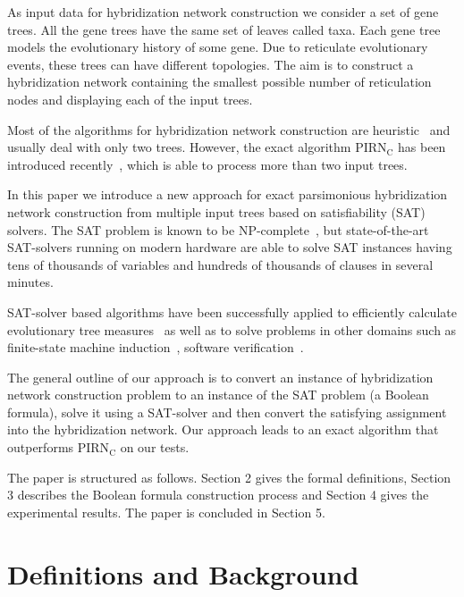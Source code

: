 \documentclass[runningheads, envcountsame, a4paper]{llncs}
\begin{document}
As input data for hybridization network construction we consider a set of gene trees. 
All the gene trees have the same set of leaves called taxa.
Each gene tree models the evolutionary history of some gene. 
Due to reticulate evolutionary events, these trees can have different topologies.
The aim is to construct a hybridization network containing the smallest possible number of 
reticulation nodes and displaying each of the input trees. 

Most of the algorithms for hybridization network construction are heuristic~\cite{wu2013algorithm, park2012murpar} 
and usually deal with only two trees.
However, the exact algorithm PIRN$_\mathrm{C}$ has been introduced recently~\cite{wu2013algorithm}, which is able to process more than two input trees.

In this paper we introduce a new approach for exact parsimonious
hybridization network construction from multiple input trees based on satisfiability (SAT) solvers.
The SAT problem is known to be NP-complete~\cite{bordewich2007computing}, but state-of-the-art SAT-solvers running on modern hardware 
are able to solve SAT instances having tens of thousands of variables and hundreds of thousands of clauses in several minutes.

SAT-solver based algorithms have been successfully applied to efficiently calculate evolutionary tree measures~\cite{bonet2009efficiently}
as well as to solve problems in other domains such as
finite-state machine induction~\cite{heule2010exact}, software verification~\cite{biere2003bounded}.

The general outline of our approach is to convert an instance of hybridization network construction 
problem to an instance of the SAT problem (a Boolean formula), solve it using a SAT-solver and then convert 
the satisfying assignment into the hybridization network.
Our approach leads to an exact algorithm that outperforms PIRN$\mathrm{_C}$ on our tests.

The paper is structured as follows. Section 2 gives the formal definitions, Section 3 describes the Boolean formula
construction process and Section 4 gives the experimental results. The paper is concluded in Section 5.

\section{Definitions and Background}
\end{document}
